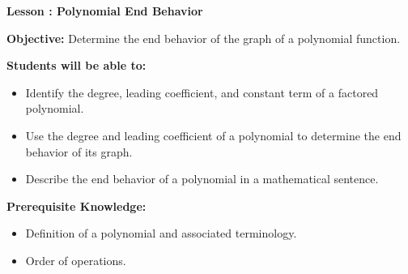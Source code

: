 \documentclass[12pt]{article}
\theoremstyle{definition}
\begin{document}
{\bf \large Lesson : Polynomial End Behavior}\label{les:end_behavior_polynomials}
\hfill \doclicenseImage[imagewidth=5em]\\
\par
{\bf Objective:} Determine the end behavior of the graph of a polynomial function.\\
\par
{\bf Students will be able to:}
\begin{itemize}
	\item Identify the degree, leading coefficient, and constant term of a factored polynomial.
	\item Use the degree and leading coefficient of a polynomial to determine the end behavior of its graph.
	\item Describe the end behavior of a polynomial in a mathematical sentence.
\end{itemize}
{\bf Prerequisite Knowledge:}
\begin{itemize}
	\item Definition of a polynomial and associated terminology.
	\item Order of operations.
\end{itemize}
\hrulefill
\end{document}
